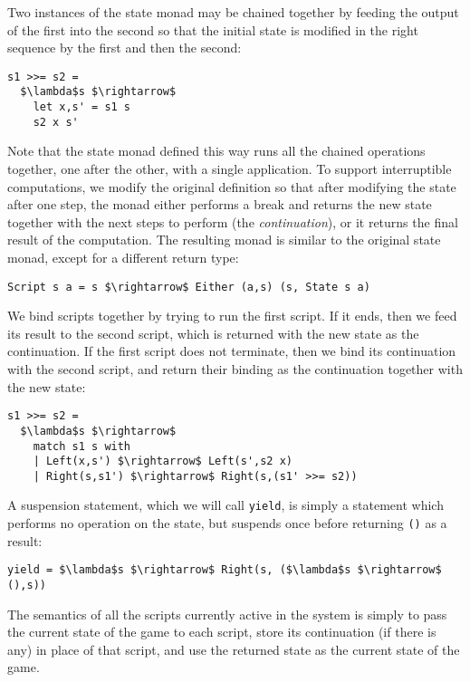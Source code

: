 Two instances of the state monad may be chained together by feeding the output of the first into the second so that the initial state is modified in the right sequence by the first and then the second:

\begin{lstlisting}
s1 >>= s2 =
  $\lambda$s $\rightarrow$
    let x,s' = s1 s
    s2 x s'
\end{lstlisting}

Note that the state monad defined this way runs all the chained operations together, one after the other, with a single application. To support interruptible computations, we modify the original definition so that after modifying the state after one step, the monad either performs a break and returns the new state together with the next steps to perform (the \textit{continuation}), or it returns the final result of the computation. The resulting monad is similar to the original state monad, except for a different return type:

\begin{lstlisting}
Script s a = s $\rightarrow$ Either (a,s) (s, State s a)
\end{lstlisting}

We bind scripts together by trying to run the first script. If it ends, then we feed its result to the second script, which is returned with the new state as the continuation. If the first script does not terminate, then we bind its continuation with the second script, and return their binding as the continuation together with the new state:

\begin{lstlisting}
s1 >>= s2 =
  $\lambda$s $\rightarrow$
    match s1 s with
    | Left(x,s') $\rightarrow$ Left(s',s2 x)
    | Right(s,s1') $\rightarrow$ Right(s,(s1' >>= s2))
\end{lstlisting}

A suspension statement, which we will call \texttt{yield}, is simply a statement which performs no operation on the state, but suspends once before returning \texttt{()} as a result:

\begin{lstlisting}
yield = $\lambda$s $\rightarrow$ Right(s, ($\lambda$s $\rightarrow$ (),s))
\end{lstlisting}

The semantics of all the scripts currently active in the system is simply to pass the current state of the game to each script, store its continuation (if there is any) in place of that script, and use the returned state as the current state of the game.


